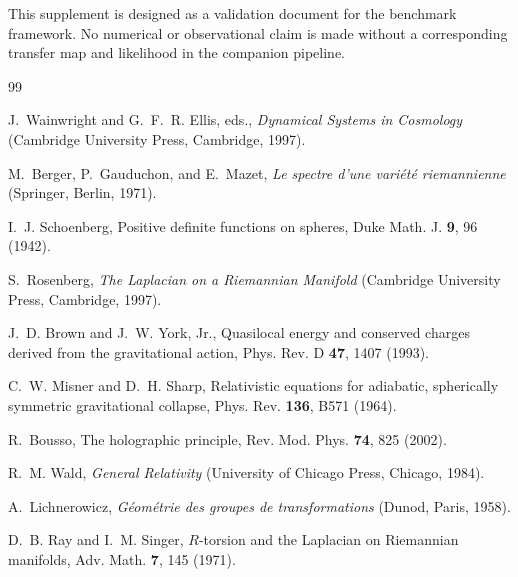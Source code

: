 \documentclass[
  aps,
  prd,
  reprint,
  superscriptaddress,
  nofootinbib,
  floatfix,
  longbibliography
]{revtex4-2}
\begin{document}
\begin{acknowledgments}
This supplement is designed as a validation document for the benchmark framework.
No numerical or observational claim is made without a corresponding transfer map
and likelihood in the companion pipeline.
\end{acknowledgments}

\begin{thebibliography}{99}

J.~Wainwright and G.~F.~R. Ellis, eds.,
\textit{Dynamical Systems in Cosmology}
(Cambridge University Press, Cambridge, 1997).

M.~Berger, P.~Gauduchon, and E.~Mazet,
\textit{Le spectre d'une vari\'et\'e riemannienne}
(Springer, Berlin, 1971).

I.~J. Schoenberg, Positive definite functions on spheres,
Duke Math. J. \textbf{9}, 96 (1942).

S.~Rosenberg, \textit{The Laplacian on a Riemannian Manifold}
(Cambridge University Press, Cambridge, 1997).

J.~D. Brown and J.~W. York, Jr.,
Quasilocal energy and conserved charges derived from the gravitational action,
Phys. Rev. D \textbf{47}, 1407 (1993).

C.~W. Misner and D.~H. Sharp,
Relativistic equations for adiabatic, spherically symmetric gravitational collapse,
Phys. Rev. \textbf{136}, B571 (1964).

R.~Bousso, The holographic principle,
Rev. Mod. Phys. \textbf{74}, 825 (2002).

R.~M. Wald, \textit{General Relativity}
(University of Chicago Press, Chicago, 1984).

A.~Lichnerowicz,
\textit{G\'eom\'etrie des groupes de transformations}
(Dunod, Paris, 1958).

D.~B. Ray and I.~M. Singer,
\(R\)-torsion and the Laplacian on Riemannian manifolds,
Adv. Math. \textbf{7}, 145 (1971).

\end{thebibliography}
\end{document}
